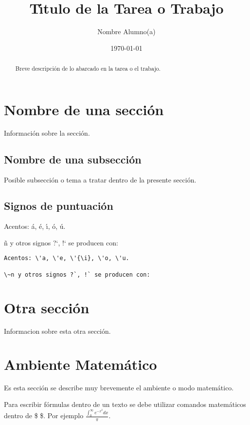 \documentclass[12pt]{article}
\author{Nombre Alumno(a)}
\date{\today}
\title{T\'{\i}tulo de la Tarea o Trabajo}
\begin{document}
\maketitle

\begin{abstract}

  Breve descripci\'on de lo abarcado en la tarea o el trabajo.

\end{abstract}

\section{Nombre de una secci\'on}

Informaci\'on sobre la secci\'on.

\subsection{Nombre de una subsecci\'on}

Posible subsecci\'on o tema a tratar dentro de la presente secci\'on.

\subsection{Signos de puntuaci\'on}

Acentos: \'a, \'e, \'{\i}, \'o, \'u.

\~n y otros signos ?`, !` se producen con:

\begin{verbatim}
Acentos: \'a, \'e, \'{\i}, \'o, \'u.

\~n y otros signos ?`, !` se producen con:
\end{verbatim}

\section{Otra secci\'on}

Informacion sobre esta otra secci\'on.

\section{Ambiente Matem\'atico}

Es esta secci\'on se describe muy brevemente el ambiente o modo
matem\'atico.

Para escribir f\'ormulas dentro de un texto se debe utilizar comandos
matem\'aticos dentro de \$ \$. Por ejemplo $\frac{\int_0^\infty
  e^{-x^2}dx}{\pi}$.
\end{document}

